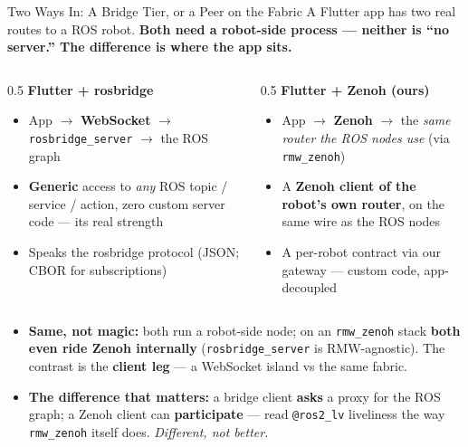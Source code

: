 \documentclass[9pt]{beamer}
\begin{document}
\begin{frame}{Two Ways In: A Bridge Tier, or a Peer on the Fabric}
  A Flutter app has two real routes to a ROS robot. \textbf{Both need a robot-side process --- neither is ``no server.'' The difference is where the app sits.}

  \vspace{0.3em}
  \begin{columns}[T]
    \begin{column}{0.5\textwidth}
      \textbf{Flutter + rosbridge}
      \begin{itemize}\small
        \item App $\to$ \textbf{WebSocket} $\to$ \texttt{rosbridge\_server} $\to$ the ROS graph
        \item \textbf{Generic} access to \emph{any} ROS topic / service / action, zero custom server code --- its real strength
        \item Speaks the rosbridge protocol (JSON; CBOR for subscriptions)
      \end{itemize}
    \end{column}
    \begin{column}{0.5\textwidth}
      \textbf{Flutter + Zenoh (ours)}
      \begin{itemize}\small
        \item App $\to$ \textbf{Zenoh} $\to$ the \emph{same router the ROS nodes use} (via \texttt{rmw\_zenoh})
        \item A \textbf{Zenoh client of the robot's own router}, on the same wire as the ROS nodes
        \item A per-robot contract via our gateway --- custom code, app-decoupled
      \end{itemize}
    \end{column}
  \end{columns}

  \vspace{0.4em}
  \begin{itemize}\small
    \item \textbf{Same, not magic:} both run a robot-side node; on an \texttt{rmw\_zenoh} stack \textbf{both even ride Zenoh internally} (\texttt{rosbridge\_server} is RMW-agnostic). The contrast is the \textbf{client leg} --- a WebSocket island vs the same fabric.
    \item \textbf{The difference that matters:} a bridge client \textbf{asks} a proxy for the ROS graph; a Zenoh client can \textbf{participate} --- read \texttt{@ros2\_lv} liveliness the way \texttt{rmw\_zenoh} itself does. \emph{Different, not better.}
  \end{itemize}
\end{frame}
\end{document}

